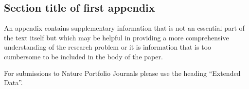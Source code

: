 \documentclass[sn-basic,pdflatex]{sn-jnl}
\theoremstyle{remark}
\theoremstyle{definition}
\begin{document}
\begin{appendices}

\section{Section title of first appendix}\label{secA1}

An appendix contains supplementary information that is not an essential
part of the text itself but which may be helpful in providing a more
comprehensive understanding of the research problem or it is information
that is too cumbersome to be included in the body of the paper.

For submissions to Nature Portfolio Journals please use the heading
``Extended Data''.

\end{appendices}


\end{document}
